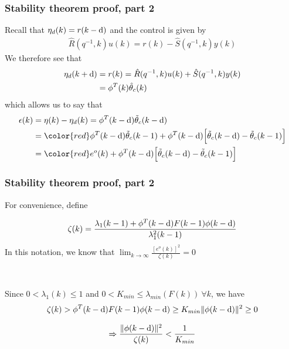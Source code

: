 \begin{frame}
    \frametitle{Stability theorem proof, part 2}

    Recall that $\eta_d(k) = r(k-\textrm{d})$ and the control is given by
    \begin{align*}
        \hat{R}(q^{-1},k) u(k) = r(k) - \hat{S}(q^{-1},k) y(k)
    \end{align*}
    \pause
    We therefore see that
    \begin{align*}
        \eta_d(k+\textrm{d}) & = r(k) = \hat{R}(q^{-1},k) u(k) + \hat{S}(q^{-1},k) y(k) \\
        & = \phi^T(k) \hat{\theta}_c(k)
    \end{align*}
    \pause
    which allows us to say that
    \begin{align*}
        \epsilon(k) & = \eta(k) - \eta_d(k) = \phi^T(k-\drm) \tilde{\theta}_c(k-\drm) \\
        & = {\color{red} \phi^T(k-\drm) \tilde{\theta}_c(k-1) } + \phi^T(k-\drm) \Big[ \tilde{\theta}_c(k-\drm)
            - \tilde{\theta}_c(k-1) \Big] \\
        & = {\color{red} e^o(k)} + \phi^T(k-\drm) \Big[ \tilde{\theta}_c(k-\drm)
            - \tilde{\theta}_c(k-1) \Big]
    \end{align*}

\end{frame}

\begin{frame}
    \frametitle{Stability theorem proof, part 2}

    For convenience, define

    \begin{align*}
        \zeta(k) = \frac{\lambda_1(k-1) + \phi^T(k-\textrm{d}) F(k-1) \phi(k-\textrm{d})}{\lambda_1^2(k-1)}
    \end{align*}
    In this notation, we know that $\displaystyle \lim_{k\rightarrow \infty} \frac{ [e^o(k)]^2 }{ \zeta(k) } = 0$
    \pause
    
    $\,$

    Since $0 < \lambda_1(k) \leq 1$ and $0 < K_{min} \leq \lambda_{min} (F(k)) \ \forall k$, we have
    \begin{gather*}
        \zeta(k) > \phi^T(k-\textrm{d}) F(k-1) \phi(k-\textrm{d})
            \geq K_{min} \| \phi(k-\textrm{d}) \|^2 \geq 0
    \end{gather*}
    \paused
    
    \begin{gather*}
        \Rightarrow \frac{ \| \phi(k-\textrm{d}) \|^2 }{\zeta(k)} < \frac{1}{K_{min}}
    \end{gather*}

\end{frame}

